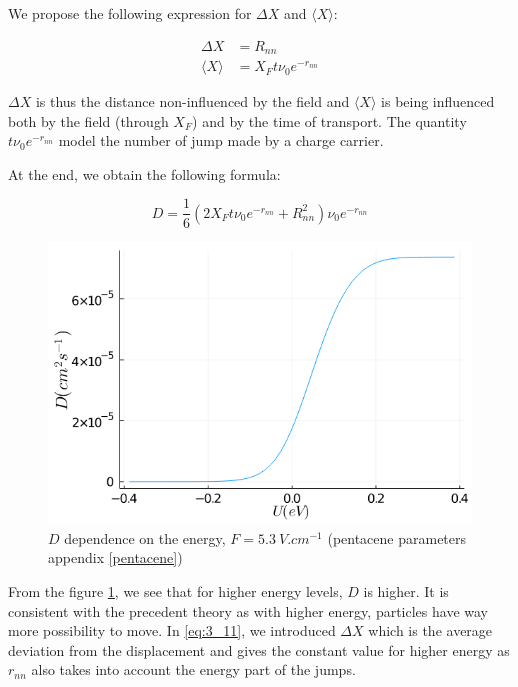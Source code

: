 We propose the following expression for $\Delta X$ and $\langle X \rangle$:

\begin{equation}
    \begin{aligned}
        \Delta X &= R_{nn} \\
        \langle X \rangle &= X_F t \nu_0 e^{-r_{nn}}
    \end{aligned}
    \label{eq:3_10}
\end{equation}

$\Delta X$ is thus the distance non-influenced by the field and $\langle X \rangle$ is being influenced both by the field (through $X_F$) and by the time of transport. The quantity $t \nu_0 e^{-r_{nn}}$ model the number of jump made by a charge carrier.

At the end, we obtain the following formula:

\begin{equation}
    D = \frac{1}{6} (2X_F t \nu_0 e^{-r_{nn}} + R_{nn}^2) \nu_0 e^{-r_{nn}}
    \label{eq:3_11}
\end{equation}

\begin{figure}[!h]
    \centering
    \includegraphics*[width=.5\paperwidth]{figures/3_elec/d_u.png}
    \caption{$D$ dependence on the energy, $F = \SI{5.3}{V . cm^{-1}}$ (pentacene parameters appendix \ref{pentacene})\label{fig:3_11}}
\end{figure}

From the figure \ref{fig:3_11}, we see that for higher energy levels, $D$ is higher. It is consistent with the precedent theory as with higher energy, particles have way more possibility to move. In \ref{eq:3_11}, we introduced $\Delta X$ which is the average deviation from the displacement and gives the constant value for higher energy as $r_{nn}$ also takes into account the energy part of the jumps.

